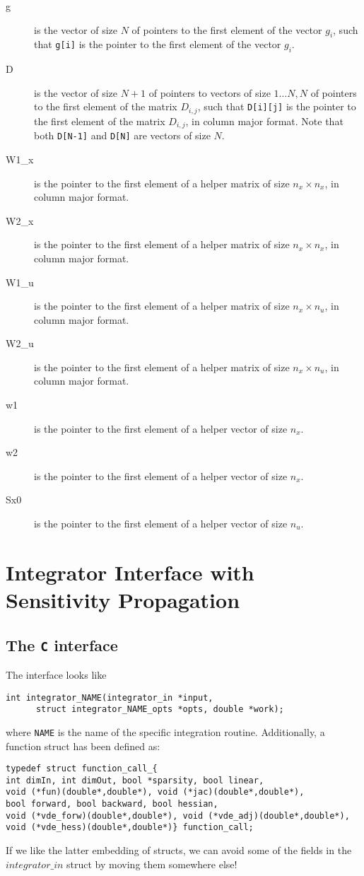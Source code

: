 \documentclass{report}
\begin{document}
\begin{description}
\begin{description}
		\item[g] is the vector of size $N$ of pointers to the first element of the vector $g_i$, such that \texttt{g[i]} is the pointer to the first element of the vector $g_i$.
		\item[D] is the vector of size $N+1$ of pointers to vectors of size $1 \ldots N, N$ of pointers to the first element of the matrix $D_{i,j}$, such that \texttt{D[i][j]} is the pointer to the first element of the matrix $D_{i,j}$, in column major format. Note that both \texttt{D[N-1]} and \texttt{D[N]} are vectors of size $N$.
		\item[W1\_x] is the pointer to the first element of a helper matrix of size $n_x \times n_x$, in column major format.
		\item[W2\_x] is the pointer to the first element of a helper matrix of size $n_x \times n_x$, in column major format.
		\item[W1\_u] is the pointer to the first element of a helper matrix of size $n_x \times n_u$, in column major format.
		\item[W2\_u] is the pointer to the first element of a helper matrix of size $n_x \times n_u$, in column major format.
		\item[w1] is the pointer to the first element of a helper vector of size $n_x$.
		\item[w2] is the pointer to the first element of a helper vector of size $n_x$.
		\item[Sx0] is the pointer to the first element of a helper vector of size $n_u$.
	\end{description}
\end{description}

\section{Integrator Interface with Sensitivity Propagation}

\subsection{The \texttt{C} interface}
The interface looks like
\begin{verbatim}
int integrator_NAME(integrator_in *input, 
      struct integrator_NAME_opts *opts, double *work);
\end{verbatim}
where \texttt{NAME} is the name of the specific integration routine. Additionally, a function struct has been defined as:
\begin{verbatim}
typedef struct function_call_{
int dimIn, int dimOut, bool *sparsity, bool linear, 
void (*fun)(double*,double*), void (*jac)(double*,double*), 
bool forward, bool backward, bool hessian,
void (*vde_forw)(double*,double*), void (*vde_adj)(double*,double*),
void (*vde_hess)(double*,double*)} function_call;
\end{verbatim}
If we like the latter embedding of structs, we can avoid some of the fields in the $integrator\_in$ struct by moving them somewhere else!
\end{document}
